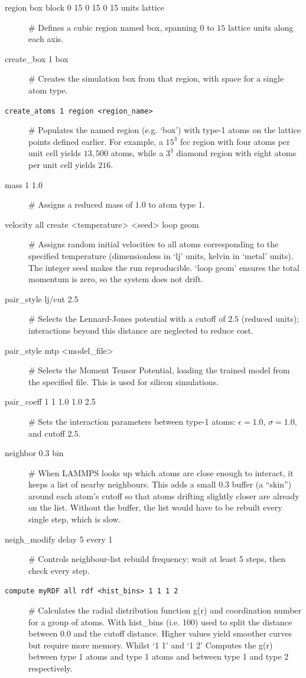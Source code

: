 \documentclass{article}
\begin{document}
\begin{description}
    \item[region box block 0 15 0 15 0 15 units lattice] \# Defines a cubic region named box, spanning $0$ to $15$ lattice units along each axis.
    \item[create\_box 1 box] \# Creates the simulation box from that region, with space for a single atom type.
    \item[\texttt{create\_atoms 1 region <region\_name>}] \# Populates the named region (e.g. `box') with type-1 atoms on the lattice points defined earlier. For example, a $15^3$ fcc region with four atoms per unit cell yields $13{,}500$ atoms, while a $3^3$ diamond region with eight atoms per unit cell yields $216$.
    \item[mass 1 1.0] \# Assigns a reduced mass of $1.0$ to atom type 1.
    \item[velocity all create <temperature> <seed> loop geom] \# Assigns random initial velocities to all atoms corresponding to the specified temperature (dimensionless in `lj' units, kelvin in `metal' units). The integer seed makes the run reproducible. `loop geom' ensures the total momentum is zero, so the system does not drift.
    \item[pair\_style lj/cut 2.5] \# Selects the Lennard-Jones potential with a cutoff of $2.5$ (reduced units); interactions beyond this distance are neglected to reduce cost.
    \item[pair\_style mtp <model\_file>] \# Selects the Moment Tensor Potential, loading the trained model from the specified file. This is used for silicon simulations.
    \item[pair\_coeff 1 1 1.0 1.0 2.5] \# Sets the interaction parameters between type-1 atoms: $\epsilon = 1.0$, $\sigma = 1.0$, and cutoff $2.5$.
    \item[neighbor 0.3 bin] \# When LAMMPS looks up which atoms are close enough to interact, it keeps a list of nearby neighbours. This adds a small $0.3$ buffer (a ``skin'') around each atom's cutoff so that atoms drifting slightly closer are already on the list. Without the buffer, the list would have to be rebuilt every single step, which is slow.
    \item[neigh\_modify delay 5 every 1] \# Controls neighbour-list rebuild frequency: wait at least 5 steps, then check every step.
    \item[\texttt{compute myRDF all rdf <hist\_bins> 1 1 1 2}] \# Calculates the radial distribution function g(r) and coordination number for a group of atoms. With hist\_bins (i.e. 100) used to split the distance between 0.0 and the cutoff distance. Higher values yield smoother curves but require more memory. Whilst `1 1' and `1 2' Computes the g(r) between type 1 atoms and type 1 atoms and between type 1 and type 2 respectively.

\end{description}
\end{document}
